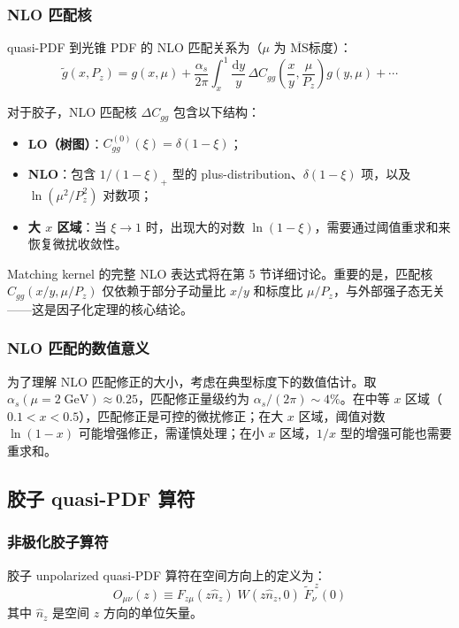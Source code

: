 \documentclass[11pt,a4paper]{ctexart}
\newcommand{\MSbar}{$\overline{\text{MS}}$}
\begin{document}
\subsubsection{NLO 匹配核}

quasi-PDF 到光锥 PDF 的 NLO 匹配关系为（$\mu$ 为 \MSbar{}标度）：
\begin{equation}
\tilde{g}(x, P_z) = g(x, \mu) + \frac{\alpha_s}{2\pi}
\int_{x}^{1} \frac{\mathrm{d}y}{y} \,
\Delta C_{gg}\!\left(\frac{x}{y}, \frac{\mu}{P_z}\right) g(y, \mu) + \cdots
\end{equation}

对于胶子，NLO 匹配核 $\Delta C_{gg}$ 包含以下结构：
\begin{itemize}
  \item \textbf{LO（树图）}：$C_{gg}^{(0)}(\xi) = \delta(1-\xi)$；
  \item \textbf{NLO}：包含 $1/(1-\xi)_+$ 型的 plus-distribution、$\delta(1-\xi)$ 项，以及 $\ln(\mu^2/P_z^2)$ 对数项；
  \item \textbf{大 $x$ 区域}：当 $\xi \to 1$ 时，出现大的对数 $\ln(1-\xi)$，需要通过阈值重求和来恢复微扰收敛性。
\end{itemize}

Matching kernel 的完整 NLO 表达式将在第 5 节详细讨论。重要的是，匹配核 $C_{gg}(x/y, \mu/P_z)$ 仅依赖于部分子动量比 $x/y$ 和标度比 $\mu/P_z$，与外部强子态无关——这是因子化定理的核心结论。

\subsubsection{NLO 匹配的数值意义}

为了理解 NLO 匹配修正的大小，考虑在典型标度下的数值估计。取 $\alpha_s(\mu=2\;\text{GeV}) \approx 0.25$，匹配修正量级约为 $\alpha_s/(2\pi) \sim 4\%$。在中等 $x$ 区域（$0.1 < x < 0.5$），匹配修正是可控的微扰修正；在大 $x$ 区域，阈值对数 $\ln(1-x)$ 可能增强修正，需谨慎处理；在小 $x$ 区域，$1/x$ 型的增强可能也需要重求和。

\subsection{胶子 quasi-PDF 算符}

\subsubsection{非极化胶子算符}

胶子 unpolarized quasi-PDF 算符在空间方向上的定义为：
\begin{equation}
O_{\mu\nu}(z) \equiv F_{z\mu}(z\hat{n}_z) \; W(z\hat{n}_z, 0) \; \tilde{F}_{\nu}^{\;z}(0)
\end{equation}
其中 $\hat{n}_z$ 是空间 $z$ 方向的单位矢量。
\end{document}
